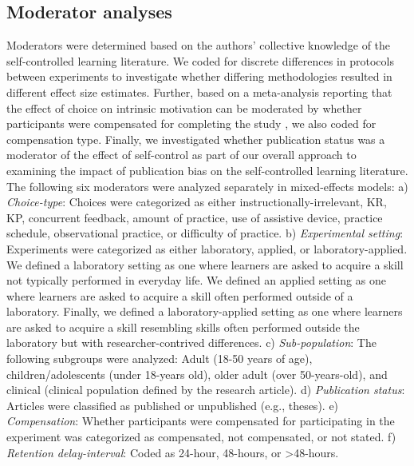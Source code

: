 \documentclass[man,floatsintext,hidelinks]{apa7}
\begin{document}
\subsection{Moderator analyses}
Moderators were determined based on the authors’ collective knowledge of the self-controlled learning literature. We coded for discrete differences in protocols between experiments to investigate whether differing methodologies resulted in different effect size estimates. Further, based on a meta-analysis reporting that the effect of choice on intrinsic motivation can be moderated by whether participants were compensated for completing the study \parencite{Patall2008-oy}, we also coded for compensation type. Finally, we investigated whether publication status was a moderator of the effect of self-control as part of our overall approach to examining the impact of publication bias on the self-controlled learning literature. The following six moderators were analyzed separately in mixed-effects models: a) \emph{Choice-type}: Choices were categorized as either instructionally-irrelevant, KR, KP, concurrent feedback, amount of practice, use of assistive device, practice schedule, observational practice, or difficulty of practice. b) \emph{Experimental setting}: Experiments were categorized as either laboratory, applied, or laboratory-applied. We defined a laboratory setting as one where learners are asked to acquire a skill not typically performed in everyday life. We defined an applied setting as one where learners are asked to acquire a skill often performed outside of a laboratory. Finally, we defined a laboratory-applied setting as one where learners are asked to acquire a skill resembling skills often performed outside the laboratory but with researcher-contrived differences. c) \emph{Sub-population}: The following subgroups were analyzed: Adult (18-50 years of age), children/adolescents (under 18-years old), older adult (over 50-years-old), and clinical (clinical population defined by the research article). d) \emph{Publication status}: Articles were classified as published or unpublished (e.g., theses). e) \emph{Compensation}: Whether participants were compensated for participating in the experiment was categorized as compensated, not compensated, or not stated. f) \emph{Retention delay-interval}: Coded as 24-hour, 48-hours, or \textgreater 48-hours. 
\end{document}
